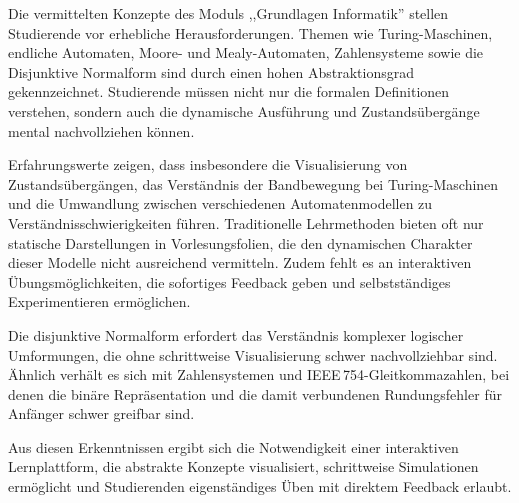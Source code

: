 
Die vermittelten Konzepte des Moduls ,,Grundlagen Informatik'' stellen Studierende vor erhebliche Herausforderungen. Themen wie Turing-Maschinen, endliche Automaten, Moore- und Mealy-Automaten, Zahlensysteme sowie die Disjunktive Normalform sind durch einen hohen Abstraktionsgrad gekennzeichnet. Studierende müssen nicht nur die formalen Definitionen verstehen, sondern auch die dynamische Ausführung und Zustandsübergänge mental nachvollziehen können.

Erfahrungswerte zeigen, dass insbesondere die Visualisierung von Zustandsübergängen, das Verständnis der Bandbewegung bei Turing-Maschinen und die Umwandlung zwischen verschiedenen Automatenmodellen zu Verständnisschwierigkeiten führen. Traditionelle Lehrmethoden bieten oft nur statische Darstellungen in Vorlesungsfolien, die den dynamischen Charakter dieser Modelle nicht ausreichend vermitteln. Zudem fehlt es an interaktiven Übungsmöglichkeiten, die sofortiges Feedback geben und selbstständiges Experimentieren ermöglichen.

Die disjunktive Normalform erfordert das Verständnis komplexer logischer Umformungen, die ohne schrittweise Visualisierung schwer nachvollziehbar sind. Ähnlich verhält es sich mit Zahlensystemen und IEEE\,754-Gleitkommazahlen, bei denen die binäre Repräsentation und die damit verbundenen Rundungsfehler für Anfänger schwer greifbar sind.

Aus diesen Erkenntnissen ergibt sich die Notwendigkeit einer interaktiven Lernplattform, die abstrakte Konzepte visualisiert, schrittweise Simulationen ermöglicht und Studierenden eigenständiges Üben mit direktem Feedback erlaubt.
